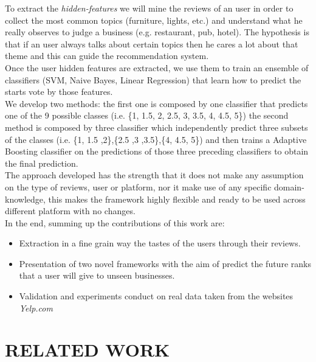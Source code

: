 \documentclass[11pt]{article}
\begin{document}
To extract the \textit{hidden-features} we will mine the reviews of an user in order to collect the most common topics (furniture, lights, etc.) and  understand what he really observes to judge a business (e.g. restaurant, pub, hotel).
The hypothesis is that if an user always talks about certain topics then he cares a lot about that theme and this can guide the recommendation system.\\
Once the user hidden features are extracted, we use them to train an ensemble of classifiers (SVM, Naive Bayes, Linear Regression) that learn how to predict the starts vote by those features.\\
We develop two methods: the first one is composed by one classifier that predicts one of the 9 possible classes (i.e. \{1, 1.5, 2, 2.5, 3, 3.5, 4, 4.5, 5\}) the second method is composed by three classifier which independently predict three subsets of the classes (i.e. \{1, 1.5 ,2\},\{2.5 ,3 ,3.5\},\{4, 4.5, 5\}) and then trains a Adaptive Boosting classifier on the predictions of those three preceding classifiers to obtain the final prediction.\\
The approach developed has the strength that it does not make any assumption on the type of reviews, user or platform, nor it make use of any specific domain-knowledge, this makes the framework highly flexible and ready to be used across different platform with no changes.\\
In the end, summing up the contributions of this work are:
\begin{itemize}
\item Extraction in a fine grain way the tastes of the users through their reviews.
\item Presentation of two novel frameworks with the aim of predict the future ranks that a user will give to unseen businesses.
\item Validation and experiments conduct on real data taken from the websites \textit{Yelp.com}
\end{itemize}

\section{RELATED WORK}
\end{document}
